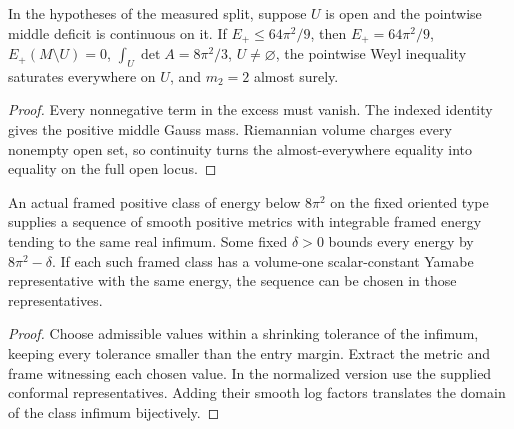 \begin{lemma}
\label{lem:ed03-equality}
\leanok
In the hypotheses of the measured split, suppose \(U\) is open and the
pointwise middle deficit is continuous on it. If \(E_+\le64\pi^2/9\),
then \(E_+=64\pi^2/9\), \(E_+(M\setminus U)=0\),
\(\int_U\det A=8\pi^2/3\), \(U\ne\varnothing\), the pointwise Weyl
inequality saturates everywhere on \(U\), and \(m_2=2\) almost surely.
\end{lemma}
\begin{proof}
\leanok
Every nonnegative term in the excess must vanish. The indexed identity
gives the positive middle Gauss mass. Riemannian volume charges every
nonempty open set, so continuity turns the almost-everywhere equality
into equality on the full open locus.
\end{proof}

\begin{lemma}
\label{lem:ed03-positive-sequence}
\leanok
An actual framed positive class of energy below \(8\pi^2\) on the fixed
oriented type supplies a sequence of smooth positive metrics with integrable
framed energy tending to the same real infimum. Some fixed
\(\delta>0\) bounds every energy by \(8\pi^2-\delta\).
If each such framed class has a volume-one scalar-constant Yamabe
representative with the same energy, the sequence can be chosen in
those representatives.
\end{lemma}
\begin{proof}
\leanok
Choose admissible values within a shrinking tolerance of the infimum,
keeping every tolerance smaller than the entry margin. Extract the
metric and frame witnessing each chosen value. In the normalized
version use the supplied conformal representatives. Adding their smooth
log factors translates the domain of the class infimum bijectively.
\end{proof}

